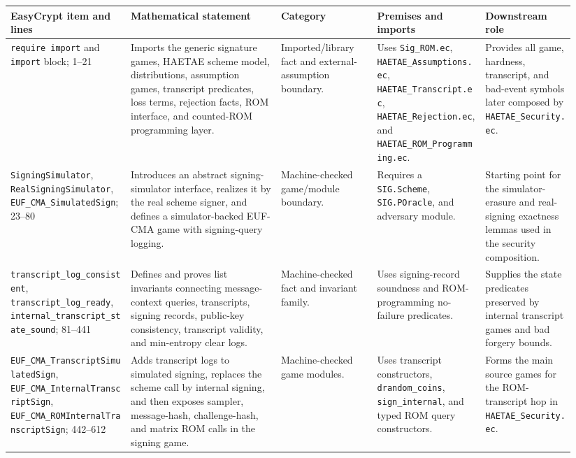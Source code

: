 \documentclass[11pt]{report}
\DeclareRobustCommand{\file}[1]{\ifmmode\text{\nolinkurl{#1}}\else\nolinkurl{#1}\fi}
\DeclareRobustCommand{\ec}[1]{\ifmmode\text{\nolinkurl{#1}}\else\nolinkurl{#1}\fi}
\theoremstyle{definition}
\theoremstyle{plain}
\begin{document}
{\footnotesize
\begin{longtable}{p{0.20\linewidth}p{0.25\linewidth}p{0.16\linewidth}p{0.18\linewidth}p{0.15\linewidth}}
\toprule
\textbf{EasyCrypt item and lines} & \textbf{Mathematical statement} &
\textbf{Category} & \textbf{Premises and imports} & \textbf{Downstream role} \\
\midrule
\ec{require import} and \ec{import} block; 1--21 &
Imports the generic signature games, HAETAE scheme model, distributions,
assumption games, transcript predicates, loss terms, rejection facts, ROM
interface, and counted-ROM programming layer. &
Imported/library fact and external-assumption boundary. &
Uses \file{Sig\_ROM.ec}, \file{HAETAE\_Assumptions.ec},
\file{HAETAE\_Transcript.ec}, \file{HAETAE\_Rejection.ec}, and
\file{HAETAE\_ROM\_Programming.ec}. &
Provides all game, hardness, transcript, and bad-event symbols later composed
by \file{HAETAE\_Security.ec}. \\
\midrule
\ec{SigningSimulator}, \ec{RealSigningSimulator},
\ec{EUF\_CMA\_SimulatedSign}; 23--80 &
Introduces an abstract signing-simulator interface, realizes it by the real
scheme signer, and defines a simulator-backed EUF-CMA game with signing-query
logging. &
Machine-checked game/module boundary. &
Requires a \ec{SIG.Scheme}, \ec{SIG.POracle}, and adversary module. &
Starting point for the simulator-erasure and real-signing exactness lemmas used
in the security composition. \\
\midrule
\ec{transcript\_log\_consistent}, \ec{transcript\_log\_ready},
\ec{internal\_transcript\_state\_sound}; 81--441 &
Defines and proves list invariants connecting message-context queries,
transcripts, signing records, public-key consistency, transcript validity, and
min-entropy clear logs. &
Machine-checked fact and invariant family. &
Uses signing-record soundness and ROM-programming no-failure predicates. &
Supplies the state predicates preserved by internal transcript games and bad
forgery bounds. \\
\midrule
\ec{EUF\_CMA\_TranscriptSimulatedSign},
\ec{EUF\_CMA\_InternalTranscriptSign},
\ec{EUF\_CMA\_ROMInternalTranscriptSign}; 442--612 &
Adds transcript logs to simulated signing, replaces the scheme call by internal
signing, and then exposes sampler, message-hash, challenge-hash, and matrix ROM
calls in the signing game. &
Machine-checked game modules. &
Uses transcript constructors, \ec{drandom\_coins}, \ec{sign\_internal}, and
typed ROM query constructors. &
Forms the main source games for the ROM-transcript hop in
\file{HAETAE\_Security.ec}. \\

\end{longtable}}
\end{document}
